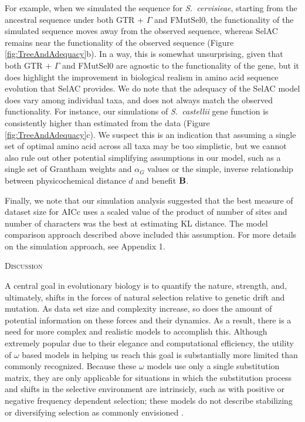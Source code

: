 \documentclass[12pt,letterpaper,fleqn]{article}
\renewcommand{\section}[1]{%
\bigskip
\begin{center}
\begin{Large}
\normalfont\scshape #1
\medskip
\end{Large}
\end{center}}
\newcommand{\Func}{\ensuremath{\text{\textbf{B}}}\xspace}
\newcommand{\selac}{SelAC\xspace}
\newcommand{\alphag}{\ensuremath{\alpha_G}\xspace}
\begin{document}
For example, when we simulated the sequence for \emph{S.~cervisieae}, starting from the ancestral sequence under both GTR + $\Gamma$ and FMutSel0, the functionality of the simulated sequence moves away from the observed sequence, whereas SelAC remains near the functionality of the observed sequence (Figure \ref{fig:TreeAndAdequacy}b).
In a way, this is somewhat unsurprising, given that both GTR + $\Gamma$ and FMutSel0 are agnostic to the functionality of the gene, but it does highlight the improvement in biological realism in amino acid sequence evolution that \selac provides.
We do note that the adequacy of the \selac model does vary among individual taxa, and does not always match the observed functionality.
For instance, our simulations of \emph{S.~castellii} gene function is consistently higher than estimated from the data (Figure \ref{fig:TreeAndAdequacy}c).
We suspect this is an indication that assuming a single set of optimal amino acid across all taxa may be too simplistic, but we cannot also rule out other potential simplifying assumptions in our model, such as a single set of Grantham weights and $\alphag$ values or the simple, inverse relationship between physicochemical distance $d$ and benefit \Func.

Finally, we note that our simulation analysis suggested that the best measure of dataset size for AICc uses a scaled value of the product of number of sites and number of characters was the best at estimating KL distance.
The model comparison approach described above included this assumption.
For more details on the simulation approach, see Appendix 1.


\section{Discussion}
A central goal in evolutionary biology is to quantify the nature, strength, and, ultimately, shifts in the forces of natural selection relative to genetic drift and mutation.
As data set size and complexity increase, so does the amount of potential information on these forces and their dynamics.
As a result, there is a need for more complex and realistic models \citep{GoldmanEtAl1996,ThorneEtAl1996,GoldmanEtAl1998,HalpernAndBruno1998,LartillotAndPhilippe2004} to accomplish this.
Although extremely popular due to their elegance and computational efficiency, the utility of $\omega$ based models in helping us reach this goal is substantially more limited than commonly recognized.
Because these $\omega$ models use only a single substitution matrix, they are only applicable for situations in which the substitution process and shifts in the selective environment are intrinsicly, such as with positive or negative frequency dependent selection; these models do not describe stabilizing or diversifying selection as commonly envisioned \citep{Endler1986a,Pelmyr2002}.
\end{document}
